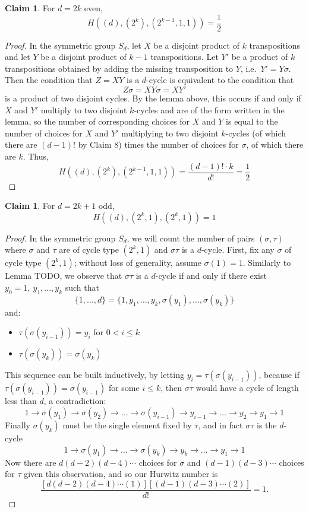 \documentclass[thesis]{thesis-umich}           %
\theoremstyle{definition}
\newtheorem{claim}[thm]{Claim}
\begin{document}
\begin{claim}
  \label{claim:twoseven}
For $d=2k$ even,
\[
H((d),(2^k),(2^{k-1},1,1))=\frac 12
\]
\end{claim}
\begin{proof}
  In the symmetric group $S_d$, let $X$ be a disjoint product of $k$ transpositions
  and let $Y$ be a disjoint product of $k-1$ transpositions. Let $Y'$ be a product
  of $k$ transpositions obtained by adding the missing transposition to $Y$, i.e.\ $Y'=Y\sigma$.
  Then the condition that $Z=XY$ is a $d$-cycle is equivalent to the condition that
  \[
  Z\sigma=XY\sigma=XY'
  \]
  is a product of two disjoint cycles. By the lemma above,
  this occurs if and only if $X$ and $Y'$ multiply to two disjoint $k$-cycles and are of
  the form written in the lemma, so the number of corresponding choices
  for $X$ and $Y$ is equal to the number of choices for $X$ and $Y'$ multiplying
  to two disjoint $k$-cycles (of which there are $(d-1)!$ by Claim 8) times the number
  of choices for $\sigma$, of which there are $k$. Thus,
  \[
  H((d),(2^k),(2^{k-1},1,1))=\frac{(d-1)!\cdot k}{d!}=\frac 12
  \]
  
  \end{proof}

\begin{claim}
  \label{claim:twosodd}
For $d=2k+1$ odd,
\[
H((d),(2^k,1),(2^k,1))=1
\]
\end{claim}
\begin{proof}
  In the symmetric group $S_d$, we will count the number of pairs $(\sigma,\tau)$ where
  $\sigma$ and $\tau$ are of cycle type $(2^k,1)$ and $\sigma\tau$ is a $d$-cycle.
  First, fix any $\sigma$ of cycle type $(2^k,1)$; without loss of generality,
  assume $\sigma(1)=1$. Similarly
  to Lemma TODO, we observe that $\sigma\tau$ is a $d$-cycle if
  and only if there exist $y_0=1,\ y_1,\dots,y_k$ such that
  \[
  \{1,\dots,d\}=\{1,y_1,\dots,y_k,\sigma(y_1),\dots,\sigma(y_k)\}
  \]
  and:
  \begin{itemize}
  \item $\tau(\sigma(y_{i-1}))=y_{i}$ for $0<i\leq k$
    \item $\tau(\sigma(y_k))=\sigma(y_k)$
  \end{itemize}
  This sequence can be built inductively,
  by letting $y_i=\tau(\sigma(y_{i-1}))$, because
  if $\tau(\sigma(y_{i-1}))=\sigma(y_{i-1})$ for some
  $i\leq k$, then
  $\sigma\tau$ would have a cycle of length less than $d$,
  a contradiction:
  \[
  1\to \sigma(y_1)\to \sigma(y_2)\to\dots\to\sigma(y_{i-1})\to y_{i-1}\to
  \dots\to y_2\to y_1\to 1
  \]
  Finally $\sigma(y_k)$ must be the single element fixed by
  $\tau$, and in fact $\sigma\tau$ is the $d$-cycle
  \[
  1\to \sigma(y_1)\to\dots\to \sigma(y_k)\to y_k\to\dots\to y_1\to 1
  \]
  Now there are $d(d-2)(d-4)\cdots$ choices for $\sigma$
  and $(d-1)(d-3)\cdots$ choices for $\tau$ given this observation,
  and so our Hurwitz number is
  \[
  \frac{[d(d-2)(d-4)\cdots(1)][(d-1)(d-3)\cdots(2)]}{d!}=1.
  \]
  
  

  \end{proof}
\end{document}
